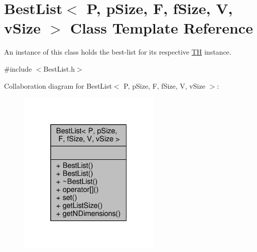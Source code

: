 \hypertarget{classBestList}{}\section{Best\+List$<$ P, p\+Size, F, f\+Size, V, v\+Size $>$ Class Template Reference}
\label{classBestList}


An instance of this class holds the best-\/list for its respective \hyperlink{classTH}{TH} instance.  




{\ttfamily \#include $<$Best\+List.\+h$>$}



Collaboration diagram for Best\+List$<$ P, p\+Size, F, f\+Size, V, v\+Size $>$\+:\nopagebreak
\begin{figure}[H]
\begin{center}
\leavevmode
\includegraphics[width=193pt]{classBestList__coll__graph}
\end{center}
\end{figure}
